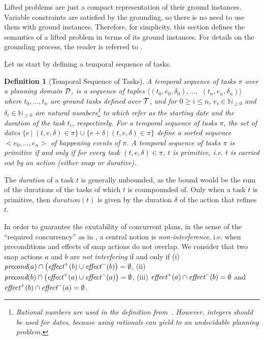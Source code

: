 \documentclass[letterpaper]{article} %
\newtheorem{definition}{Definition}
\newcommand{\pre}{\text{\it precond}}
\newcommand{\add}{\text{\it effect}^{+}}
\newcommand{\del}{\text{\it effect}^{-}}
\begin{document}
  Lifted problems are just a compact representation of their ground instances. Variable constraints are satisfied by the grounding, so there is no need to use them with ground instances. Therefore, for simplicity, this section defines the semantics of a lifted problem in terms of its ground instances. For details on the grounding process, the reader is referred to \cite{behnke20,ramoul17}.

Let us start by defining a temporal sequence of tasks.
\begin{definition}[Temporal Sequence of Tasks] %
  A \emph{temporal sequence of tasks} $\pi$ over a planning domain $\cal{D}$, is a sequence of tuples $\langle (t_0, e_0, \delta_0), \ldots,$ $(t_n, e_n, \delta_n) \rangle$ where $t_0, \ldots, t_n$ are ground tasks defined over $\cal{T}$, and for $0 \ge i \le n$, $e_i \in \mathbb{N}_{\geq 0}$ and $\delta_i \in \mathbb{N}_{\geq 0}$ are natural numbers\footnote{
    Rational numbers are used in the definition from~\citet{fox03}. However, integers should be used for dates, because using rationals can yield to an undecidable planning problem.}
  to which refer as the starting date and the duration of the task $t_i$, respectively.
  For a temporal sequence of tasks $\pi$, the set of dates $\{e \ | \ (t, e, \delta) \in \pi\} \cup \{e + \delta \ | \ (t, e, \delta) \in \pi\}$  define a sorted sequence $<e_0, \ldots, e_n>$ of \emph{happening events} of $\pi$. %
A temporal sequence of tasks  $\pi$ is primitive if and only if for every task  $(t, e, \delta) \in \pi$, $t$ is primitive, i.e. $t$ is carried out by an action (either snap or durative).
\end{definition}

The \emph{duration} of a task $t$ is generally unbounded, as the bound would be the sum of the durations of the tasks of which $t$ is coumpounded of. Only when a task $t$ is primitive, then $duration(t)$ is given by the duration $\delta$ of the action that refines $t$.


In order to guarantee the exutability of concurrent plans, in the sense of the ``required concurrency'' as in \citet{cushing2007temporal}, a central notion is {\it non-interference}, i.e. when preconditions and effects of snap actions do not overlap. 
We consider that two snap actions $a$ and $b$ are \emph{not interfering} if and only if (i) $\pre(a) \cap \bigl(\add(b) \cup \del(b)\bigr) = \emptyset$, (ii) $\pre(b) \cap \bigl(\add(a) \cup \del(a)\bigr) = \emptyset$, (iii) $\add(a) \cap \del(b) = \emptyset$ and  $\add(b) \cap \del(a) = \emptyset$.
\end{document}
